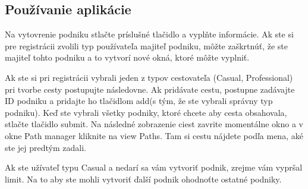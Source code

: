 \documentclass{article}
\begin{document}
\subsection{Používanie aplikácie}
Na vytovrenie podniku stlačte príslušné tlačidlo a vyplňte informácie. Ak ste si pre registrácii zvolili typ používateľa majiteľ podniku, môžte zaškrtnúť, že ste majiteľ tohto podniku a to vytvorí nové okná, ktoré môžte vyplniť.

Ak ste si pri registrácii vybrali jeden z typov cestovateľa (Casual, Professional) pri tvorbe cesty postupujte následovne. Ak pridávate cestu, postupne zadávajte ID podniku a pridajte ho tlačidlom add(s tým, že ste vybrali správny typ podniku). Keď ste vybrali všetky podniky, ktoré chcete aby cesta obsahovala, stlačte tlačidlo submit.
Na následné zobrazenie ciest zavrite momentálne okno a v okne Path manager kliknite na view Paths. Tam si cestu nájdete podľa mena, aké ste jej predtým zadali.

Ak ste užívateľ typu Casual a nedarí sa vám vytvoriť podnik, zrejme vám vypršal limit. Na to aby ste mohli vytvoriť ďalší podnik ohodnoťte ostatné podniky.
\end{document}
